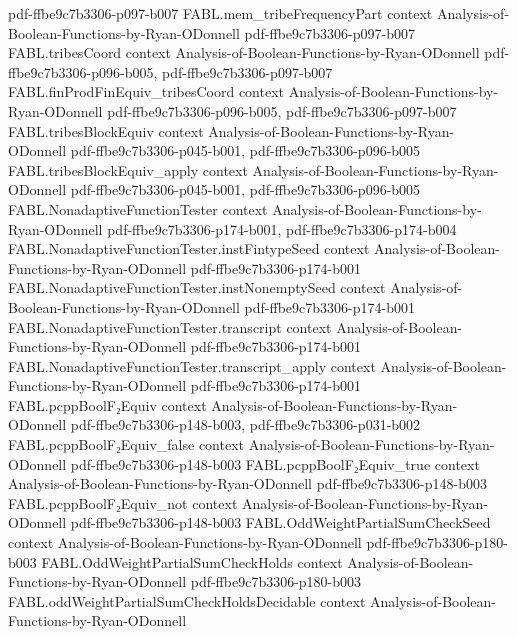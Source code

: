 \begin{theorem}
  {pdf-ffbe9c7b3306-p097-b007}
\proofstep
  {FABL.mem_tribeFrequencyPart}
  {context}
  {Analysis-of-Boolean-Functions-by-Ryan-ODonnell}
  {pdf-ffbe9c7b3306-p097-b007}
\proofstep
  {FABL.tribesCoord}
  {context}
  {Analysis-of-Boolean-Functions-by-Ryan-ODonnell}
  {pdf-ffbe9c7b3306-p096-b005,
    pdf-ffbe9c7b3306-p097-b007}
\proofstep
  {FABL.finProdFinEquiv_tribesCoord}
  {context}
  {Analysis-of-Boolean-Functions-by-Ryan-ODonnell}
  {pdf-ffbe9c7b3306-p096-b005,
    pdf-ffbe9c7b3306-p097-b007}
\proofstep
  {FABL.tribesBlockEquiv}
  {context}
  {Analysis-of-Boolean-Functions-by-Ryan-ODonnell}
  {pdf-ffbe9c7b3306-p045-b001,
    pdf-ffbe9c7b3306-p096-b005}
\proofstep
  {FABL.tribesBlockEquiv_apply}
  {context}
  {Analysis-of-Boolean-Functions-by-Ryan-ODonnell}
  {pdf-ffbe9c7b3306-p045-b001,
    pdf-ffbe9c7b3306-p096-b005}
\proofstep
  {FABL.NonadaptiveFunctionTester}
  {context}
  {Analysis-of-Boolean-Functions-by-Ryan-ODonnell}
  {pdf-ffbe9c7b3306-p174-b001,
    pdf-ffbe9c7b3306-p174-b004}
\proofstep
  {FABL.NonadaptiveFunctionTester.instFintypeSeed}
  {context}
  {Analysis-of-Boolean-Functions-by-Ryan-ODonnell}
  {pdf-ffbe9c7b3306-p174-b001}
\proofstep
  {FABL.NonadaptiveFunctionTester.instNonemptySeed}
  {context}
  {Analysis-of-Boolean-Functions-by-Ryan-ODonnell}
  {pdf-ffbe9c7b3306-p174-b001}
\proofstep
  {FABL.NonadaptiveFunctionTester.transcript}
  {context}
  {Analysis-of-Boolean-Functions-by-Ryan-ODonnell}
  {pdf-ffbe9c7b3306-p174-b001}
\proofstep
  {FABL.NonadaptiveFunctionTester.transcript_apply}
  {context}
  {Analysis-of-Boolean-Functions-by-Ryan-ODonnell}
  {pdf-ffbe9c7b3306-p174-b001}
\proofstep
  {FABL.pcppBoolF₂Equiv}
  {context}
  {Analysis-of-Boolean-Functions-by-Ryan-ODonnell}
  {pdf-ffbe9c7b3306-p148-b003,
    pdf-ffbe9c7b3306-p031-b002}
\proofstep
  {FABL.pcppBoolF₂Equiv_false}
  {context}
  {Analysis-of-Boolean-Functions-by-Ryan-ODonnell}
  {pdf-ffbe9c7b3306-p148-b003}
\proofstep
  {FABL.pcppBoolF₂Equiv_true}
  {context}
  {Analysis-of-Boolean-Functions-by-Ryan-ODonnell}
  {pdf-ffbe9c7b3306-p148-b003}
\proofstep
  {FABL.pcppBoolF₂Equiv_not}
  {context}
  {Analysis-of-Boolean-Functions-by-Ryan-ODonnell}
  {pdf-ffbe9c7b3306-p148-b003}
\proofstep
  {FABL.OddWeightPartialSumCheckSeed}
  {context}
  {Analysis-of-Boolean-Functions-by-Ryan-ODonnell}
  {pdf-ffbe9c7b3306-p180-b003}
\proofstep
  {FABL.OddWeightPartialSumCheckHolds}
  {context}
  {Analysis-of-Boolean-Functions-by-Ryan-ODonnell}
  {pdf-ffbe9c7b3306-p180-b003}
\proofstep
  {FABL.oddWeightPartialSumCheckHoldsDecidable}
  {context}
  {Analysis-of-Boolean-Functions-by-Ryan-ODonnell}

\end{theorem}

